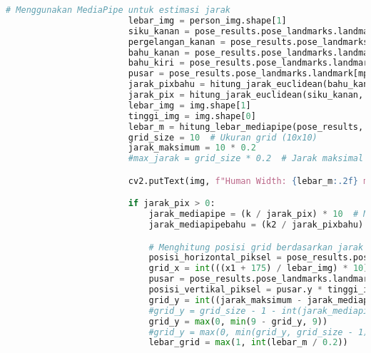 \begin{lstlisting}[language=Python]
                        # Menggunakan MediaPipe untuk estimasi jarak
                        lebar_img = person_img.shape[1]
                        siku_kanan = pose_results.pose_landmarks.landmark[mp_pose.PoseLandmark.RIGHT_ELBOW]
                        pergelangan_kanan = pose_results.pose_landmarks.landmark[mp_pose.PoseLandmark.RIGHT_WRIST]
                        bahu_kanan = pose_results.pose_landmarks.landmark[mp_pose.PoseLandmark.RIGHT_SHOULDER]
                        bahu_kiri = pose_results.pose_landmarks.landmark[mp_pose.PoseLandmark.LEFT_SHOULDER]
                        pusar = pose_results.pose_landmarks.landmark[mp_pose.PoseLandmark.NOSE]
                        jarak_pixbahu = hitung_jarak_euclidean(bahu_kanan, bahu_kiri, lebar_img)
                        jarak_pix = hitung_jarak_euclidean(siku_kanan, pergelangan_kanan, lebar_img)
                        lebar_img = img.shape[1]
                        tinggi_img = img.shape[0]
                        lebar_m = hitung_lebar_mediapipe(pose_results, lebar_img)
                        grid_size = 10  # Ukuran grid (10x10)
                        jarak_maksimum = 10 * 0.2 
                        #max_jarak = grid_size * 0.2  # Jarak maksimal yang dapat diwakili grid (2 meter dalam kasus ini)

                        cv2.putText(img, f"Human Width: {lebar_m:.2f} m", (10,240), cv2.FONT_HERSHEY_SIMPLEX, 0.6, (255, 255, 255), 2)

                        if jarak_pix > 0:
                            jarak_mediapipe = (k / jarak_pix) * 10  # Menyesuaikan dengan faktor kalibrasi
                            jarak_mediapipebahu = (k2 / jarak_pixbahu) * 10 

                            # Menghitung posisi grid berdasarkan jarak MediaPipe
                            posisi_horizontal_piksel = pose_results.pose_landmarks.landmark[mp_pose.PoseLandmark.NOSE].x * lebar_img
                            grid_x = int(((x1 + 175) / lebar_img) * 10)
                            pusar = pose_results.pose_landmarks.landmark[mp_pose.PoseLandmark.NOSE]
                            posisi_vertikal_piksel = pusar.y * tinggi_img
                            grid_y = int((jarak_maksimum - jarak_mediapipe) / 0.2)
                            #grid_y = grid_size - 1 - int(jarak_mediapipe / 0.2)
                            grid_y = max(0, min(9 - grid_y, 9))
                            #grid_y = max(0, min(grid_y, grid_size - 1))
                            lebar_grid = max(1, int(lebar_m / 0.2))


\end{lstlisting}
